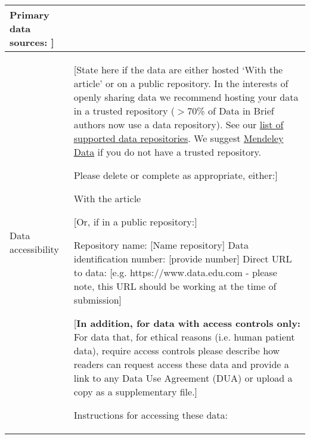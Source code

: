 \documentclass[times,final]{elsarticle}
\begin{document}
{\begin{longtable}{|p{33mm}|p{94mm}|}
                         Primary data sources:  ]\\
\hline
\hypertarget{target1}
{Data accessibility}   & [State here if the data are either hosted `With the article' or on a public repository.
                         In the interests of openly sharing data we recommend hosting your data in a
                         trusted repository ($>$70\% of Data in Brief authors now use a data repository).
                         See our \href{https://www.elsevier.com/authors/author-resources/research-data/data-base-linking#repositories}{list of supported data repositories}.
                         We suggest \href{https://data.mendeley.com/}{Mendeley Data} if you do not have a trusted repository.\newline

                         Please delete or complete as appropriate, either:]\newline

                         With the article\newline

                         [Or, if in a public repository:]\newline

                         Repository name: [Name repository]\newline
                         Data identification number: [provide number]\newline
                         Direct URL to data: [e.g. https://www.data.edu.com - please note,\newline
                         this URL should be working at the time of submission]\newline

                         [\textbf{In addition, for data with access controls only:} For data that,
                         for ethical reasons (i.e. human patient data),
                         require access controls please describe
                         how readers can request access these data and provide a link to any
                         Data Use Agreement (DUA) or upload a copy as a supplementary file.]\newline

                         Instructions for accessing these data:\newline


\end{longtable}}
\end{document}
